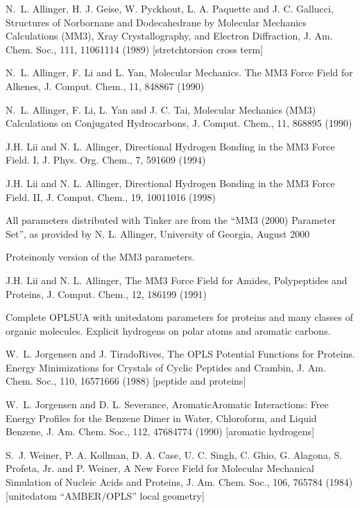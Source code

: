 \documentclass[letterpaper,11pt,english]{sphinxmanual}
\begin{document}
N. L. Allinger, H. J. Geise, W. Pyckhout, L. A. Paquette and J. C. Gallucci, Structures of Norbornane and Dodecahedrane by Molecular Mechanics Calculations (MM3), X\sphinxhyphen{}ray Crystallography, and Electron Diffraction, J. Am. Chem. Soc., 111, 1106\sphinxhyphen{}1114 (1989)  {[}stretch\sphinxhyphen{}torsion cross term{]}

N. L. Allinger, F. Li and L. Yan, Molecular Mechanics. The MM3 Force Field for Alkenes, J. Comput. Chem., 11, 848\sphinxhyphen{}867 (1990)

N. L. Allinger, F. Li, L. Yan and J. C. Tai, Molecular Mechanics (MM3) Calculations on Conjugated Hydrocarbons, J. Comput. Chem., 11, 868\sphinxhyphen{}895 (1990)

J.\sphinxhyphen{}H. Lii and N. L. Allinger, Directional Hydrogen Bonding in the MM3 Force Field. I, J. Phys. Org. Chem., 7, 591\sphinxhyphen{}609 (1994)

J.\sphinxhyphen{}H. Lii and N. L. Allinger, Directional Hydrogen Bonding in the MM3 Force Field. II, J. Comput. Chem., 19, 1001\sphinxhyphen{}1016 (1998)

All parameters distributed with Tinker are from the “MM3 (2000) Parameter Set”, as provided by N. L. Allinger, University of Georgia, August 2000


Protein\sphinxhyphen{}only version of the MM3 parameters.

J.\sphinxhyphen{}H. Lii and N. L. Allinger, The MM3 Force Field for Amides, Polypeptides and Proteins, J. Comput. Chem., 12, 186\sphinxhyphen{}199 (1991)


Complete OPLS\sphinxhyphen{}UA with united\sphinxhyphen{}atom parameters for proteins and many classes of organic molecules. Explicit hydrogens on polar atoms and aromatic carbons.

W. L. Jorgensen and J. Tirado\sphinxhyphen{}Rives, The OPLS Potential Functions for Proteins. Energy Minimizations for Crystals of Cyclic Peptides and Crambin, J. Am. Chem. Soc., 110, 1657\sphinxhyphen{}1666 (1988)  {[}peptide and proteins{]}

W. L. Jorgensen and D. L. Severance, Aromatic\sphinxhyphen{}Aromatic Interactions: Free Energy Profiles for the Benzene Dimer in Water, Chloroform, and Liquid Benzene, J. Am. Chem. Soc., 112, 4768\sphinxhyphen{}4774 (1990)  {[}aromatic hydrogens{]}

S. J. Weiner, P. A. Kollman, D. A. Case, U. C. Singh, C. Ghio, G. Alagona, S. Profeta, Jr. and P. Weiner, A New Force Field for Molecular Mechanical Simulation of Nucleic Acids and Proteins, J. Am. Chem. Soc., 106, 765\sphinxhyphen{}784 (1984)  {[}united\sphinxhyphen{}atom “AMBER/OPLS” local geometry{]}
\end{document}
